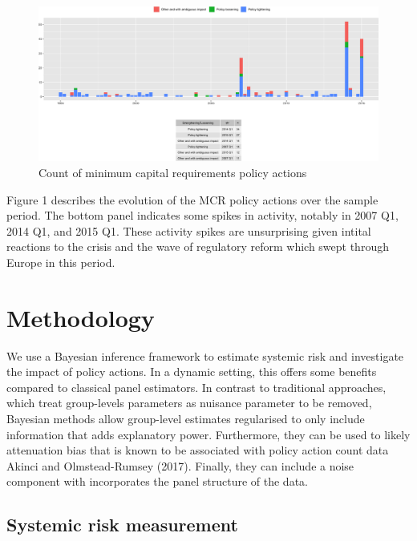 \documentclass[
  10pt,
]{article}
\begin{document}
\begin{figure}
\centering
\includegraphics{figures/paper-fig1-1.png}
\caption{Count of minimum capital requirements policy actions}
\end{figure}

Figure 1 describes the evolution of the MCR policy actions over the
sample period. The bottom panel indicates some spikes in activity,
notably in 2007 Q1, 2014 Q1, and 2015 Q1. These activity spikes are
unsurprising given intital reactions to the crisis and the wave of
regulatory reform which swept through Europe in this period.

\hypertarget{meth}{%
\section{Methodology}\label{meth}}

We use a Bayesian inference framework to estimate systemic risk and
investigate the impact of policy actions. In a dynamic setting, this
offers some benefits compared to classical panel estimators. In contrast
to traditional approaches, which treat group-levels parameters as
nuisance parameter to be removed, Bayesian methods allow group-level
estimates regularised to only include information that adds explanatory
power. Furthermore, they can be used to likely attenuation bias that is
known to be associated with policy action count data Akinci and
Olmstead-Rumsey (2017). Finally, they can include a noise component with
incorporates the panel structure of the data.

\hypertarget{systemic-risk-measurement}{%
\subsection{Systemic risk measurement}\label{systemic-risk-measurement}}
\end{document}
